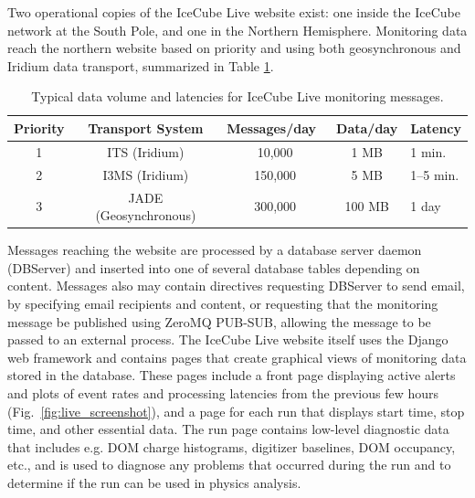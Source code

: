Two operational copies of the IceCube Live website exist: one inside the
IceCube network at the South Pole, and one in the Northern Hemisphere.
Monitoring data reach the northern website based on priority and using
both geosynchronous and Iridium data transport, summarized in Table
\ref{i3messages}.

\begin{table}[!ht]
\begin{tabularx}{\textwidth}{|c|c|c|c|X|}
  \hline Priority & Transport System & Messages/day~ & Data/day & Latency\\
  \hline 1 & ITS (Iridium) & 10,000 & 1 MB & 1 min. \\
  \hline 2 & I3MS (Iridium) & 150,000 & 5 MB & 1--5 min. \\
  \hline 3 & JADE (Geosynchronous) & 300,000 & 100 MB & 1 day \\
  \hline
\end{tabularx}
\caption{Typical data volume and latencies for IceCube Live monitoring
  messages.} 
\label{i3messages}
\end{table}

Messages reaching the website are processed by a database server daemon
(DBServer) and inserted into one of several database tables depending on content.
Messages also may contain directives requesting DBServer to send email, by
specifying email recipients and content, or requesting that the monitoring
message be published using ZeroMQ PUB-SUB, allowing the message to be
passed to an external process.  The IceCube Live website itself uses the
Django web framework and contains pages that create graphical views of
monitoring data stored in the database.  These pages include a front page
displaying active alerts and plots of event rates and processing latencies
from the previous few hours (Fig.~\ref{fig:live_screenshot}), and a page
for each run that displays start  
time, stop time, and other essential data.  The run page contains low-level
diagnostic data that includes e.g. DOM charge histograms, digitizer baselines,
DOM occupancy, etc., and is used to diagnose any problems that occurred
during the run and to determine if the run can be used in physics analysis.


